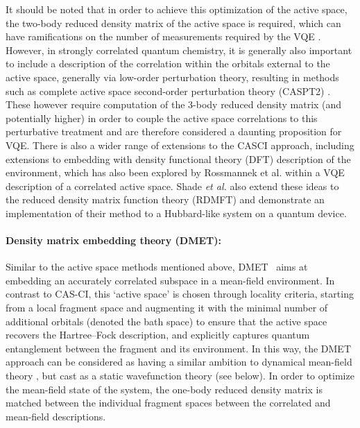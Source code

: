 It should be noted that in order to achieve this optimization of the active space, the two-body reduced density matrix of the active space is required, which can have ramifications on the number of measurements required by the VQE \cite{Tilly2021}. However, in strongly correlated quantum chemistry, it is generally also important to include a description of the correlation within the orbitals external to the active space, generally via low-order perturbation theory, resulting in methods such as complete active space second-order perturbation theory (CASPT2) \cite{Abe2008}. These however require computation of the 3-body reduced density matrix (and potentially higher) in order to couple the active space correlations to this perturbative treatment and are therefore considered a daunting proposition for VQE. There is also a wider range of extensions to the CASCI approach, including extensions to embedding with density functional theory (DFT) description of the environment, which has also been explored by Rossmannek et al. \cite{Rossmannek2021} within a VQE description of a correlated active space. Shade \textit{et al.} \cite{Schade2022} also extend these ideas to the reduced density matrix function theory (RDMFT) and demonstrate an implementation of their method to a Hubbard-like system on a quantum device.

\paragraph{Density matrix embedding theory (DMET):} Similar to the active space methods mentioned above, DMET~\cite{Knizia2013, Wouters2016} aims at embedding an accurately correlated subspace in a mean-field environment. In contrast to CAS-CI, this `active space' is chosen through locality criteria, starting from a local fragment space and augmenting it with the minimal number of additional orbitals (denoted the bath space) to ensure that the active space recovers the Hartree--Fock description, and explicitly captures quantum entanglement between the fragment and its environment. In this way, the DMET approach can be considered as having a similar ambition to dynamical mean-field theory \cite{Georges1996}, but cast as a static wavefunction theory (see below). In order to optimize the mean-field state of the system, the one-body reduced density matrix is matched between the individual fragment spaces between the correlated and mean-field descriptions.

